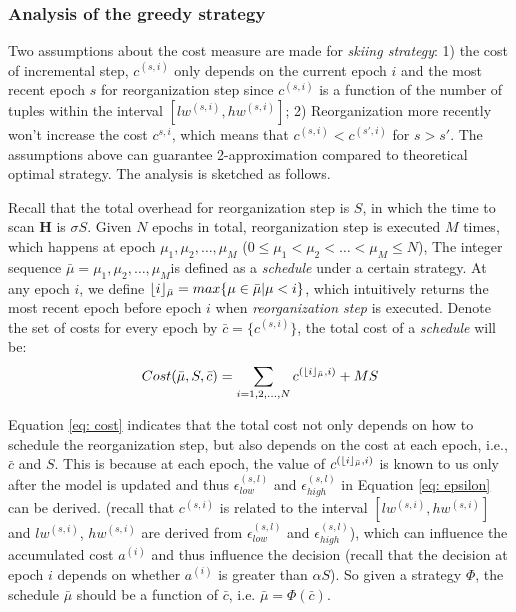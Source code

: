 \subsubsection{Analysis of the greedy strategy}
Two assumptions about the cost measure are made for {\em skiing strategy}: 1) the cost of incremental step, $c^{(s, i)}$ only depends on the current epoch $i$ and the most recent epoch $s$ for reorganization step since $c^{(s, i)}$ is a function of the number of tuples within the interval $[lw^{(s,i)}, hw^{(s,i)}]$; 2) Reorganization more recently won't increase the cost $c^{s,i}$, which means that $c^{(s, i)} < c^{(s',i)}$ for $s > s'$. The assumptions above can guarantee 2-approximation compared to theoretical optimal strategy. The analysis is sketched as follows.

Recall that the total overhead for reorganization step is $S$, in which the time to scan $\textbf{H}$ is $\sigma S$. Given $N$ epochs in total, reorganization step is executed $M$ times, which happens at epoch $\mu_1, \mu_2,\dots, \mu_M$ ($0 \leq \mu_1 < \mu_2 < \dots < \mu_M \leq N$), The integer sequence $\bar{\mu} = \mu_1, \mu_2,\dots, \mu_M$is defined as a {\em schedule} under a certain strategy. At any epoch $i$, we define $\lfloor i\rfloor_{\bar{\mu}} = max\{\mu \in \bar{\mu} | \mu < i\}$, which intuitively returns the most recent epoch before epoch $i$ when {\em reorganization step} is executed. Denote the set of costs for every epoch by $\bar{c} = \{c^{(s,i)}\}$, the total cost of a {\em schedule} will be:
\begin{equation}\label{eq: cost}
    Cost(\bar{\mu}, S, \bar{c}) = \sum_{i=1,2,\dots,N}c^{(\lfloor i\rfloor_{\bar{\mu}}, i)} + MS
\end{equation}

Equation \ref{eq: cost} indicates that the total cost not only depends on how to schedule the reorganization step, but also depends on the cost at each epoch, i.e., $\bar{c}$ and $S$. This is because at each epoch, the value of $c^{(\lfloor i\rfloor_{\bar{\mu}}, i)}$ is known to us only after the model is updated and thus $\epsilon^{(s,l)}_{low}$ and $\epsilon^{(s,l)}_{high}$ in Equation \ref{eq: epsilon} can be derived. (recall that $c^{(s,i)}$ is related to the interval $[lw^{(s,i)}, hw^{(s,i)}]$ and $lw^{(s,i)}$, $hw^{(s,i)}$ are derived from $\epsilon^{(s,l)}_{low}$ and $\epsilon^{(s,l)}_{high}$), which can influence the accumulated cost $a^{(i)}$ and thus influence the decision (recall that the decision at epoch $i$ depends on whether $a^{(i)}$ is greater than $\alpha S$). So given a strategy $\Phi$, the schedule $\bar{\mu}$ should be a function of $\bar{c}$, i.e. $\bar{\mu} = \Phi(\bar{c})$.

